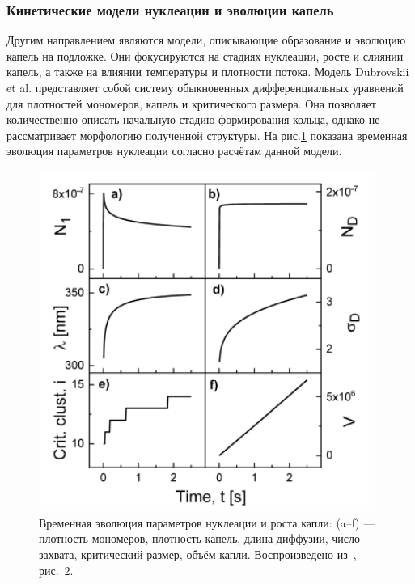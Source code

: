 \documentclass[14pt,oneside]{extarticle}
\begin{document}
\subsubsection*{Кинетические модели нуклеации и эволюции капель}
Другим направлением являются модели, описывающие образование и эволюцию капель на подложке. Они фокусируются на стадиях нуклеации, росте и слиянии капель, а также на влиянии температуры и плотности потока. Модель Dubrovskii et al.\cite{dubrovskii2021} представляет собой систему обыкновенных дифференциальных уравнений для плотностей мономеров, капель и критического размера. Она позволяет количественно описать начальную стадию формирования кольца, однако не рассматривает морфологию полученной структуры. На рис.\ref{fig:dubrovskii_model} показана временная эволюция параметров нуклеации согласно расчётам данной модели.

\begin{figure}
    \begin{center}
        \includegraphics[width=11cm]{images/dubrovskii_fig2.png}
        \caption{\label{fig:dubrovskii_model}
            Временная эволюция параметров нуклеации и роста капли: (a--f) — плотность мономеров, плотность капель, длина диффузии, число захвата, критический размер, объём капли. Воспроизведено из~\cite{dubrovskii2021}, рис.~2.}
    \end{center}
\end{figure}
\end{document}
